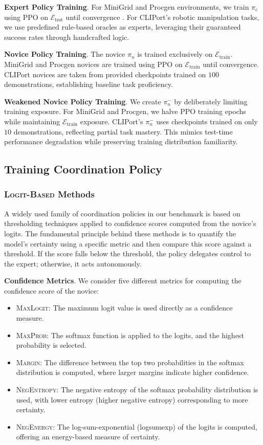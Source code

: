 \textbf{Expert Policy Training}.
For MiniGrid and Procgen environments, we train $\pi_e$ using PPO on $\mathcal{E}_{\text{test}}$ until convergence \citep{huang2024open}. For CLIPort's robotic manipulation tasks, we use predefined rule-based oracles as experts, leveraging their guaranteed success rates through handcrafted logic.

\textbf{Novice Policy Training}. 
The novice $\pi_n$ is trained exclusively on $\mathcal{E}_{\text{train}}$. MiniGrid and Procgen novices are trained using PPO on $\mathcal{E}_{\text{train}}$ until convergence. CLIPort novices are taken from provided checkpoints trained on $100$ demonstrations, establishing baseline task proficiency.

\textbf{Weakened Novice Policy Training}.
We create $\pi_n^-$ by deliberately limiting training exposure. For MiniGrid and Procgen, we halve PPO training epochs while maintaining $\mathcal{E}_{\text{train}}$ exposure. CLIPort's $\pi_n^-$ uses checkpoints trained on only $10$ demonstrations, reflecting partial task mastery. This mimics test-time performance degradation while preserving training distribution familiarity.



\subsection{Training Coordination Policy}\label{app:coord_policy}

\subsubsection{\textsc{Logit-Based} Methods}
A widely used family of coordination policies in our benchmark is based on thresholding techniques applied to confidence scores computed from the novice's logits. The fundamental principle behind these methods is to quantify the model’s certainty using a specific metric and then compare this score against a threshold. If the score falls below the threshold, the policy delegates control to the expert; otherwise, it acts autonomously.

\textbf{Confidence Metrics}.  
We consider five different metrics for computing the confidence score of the novice:
\begin{itemize}
    \item \textsc{MaxLogit}: The maximum logit value is used directly as a confidence measure.
    \item \textsc{MaxProb}: The softmax function is applied to the logits, and the highest probability is selected.
    \item \textsc{Margin}: The difference between the top two probabilities in the softmax distribution is computed, where larger margins indicate higher confidence.
    \item \textsc{NegEntropy}: The negative entropy of the softmax probability distribution is used, with lower entropy (higher negative entropy) corresponding to more certainty.
    \item \textsc{NegEnergy}: The log-sum-exponential (logsumexp) of the logits is computed, offering an energy-based measure of certainty.
\end{itemize}

